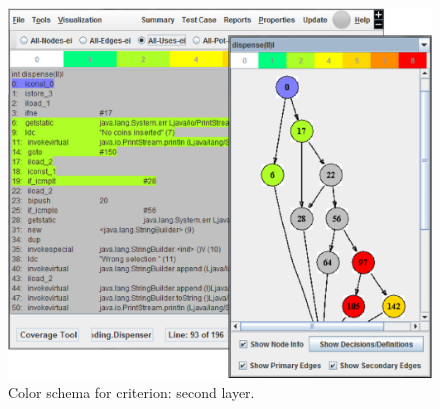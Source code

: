 
\begin{figure}[!ht]
\begin{center}
\includegraphics[height=0.40\textheight]{fig/pri-uses-layer2.eps}
\caption{\label{fig:uses-color2} Color schema for
 criterion: second layer.}
\end{center}
\end{figure}
